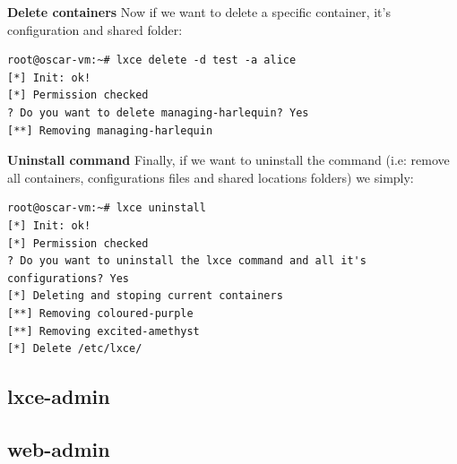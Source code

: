 \textbf{Delete containers}
Now if we want to delete a specific container, it's configuration and shared folder:

\begin{verbatim}
root@oscar-vm:~# lxce delete -d test -a alice
[*] Init: ok!
[*] Permission checked
? Do you want to delete managing-harlequin? Yes
[**] Removing managing-harlequin
\end{verbatim}

\textbf{Uninstall command}
Finally, if we want to uninstall the command (i.e: remove all containers, configurations files and shared locations folders) we simply:
\begin{verbatim}
root@oscar-vm:~# lxce uninstall
[*] Init: ok!
[*] Permission checked
? Do you want to uninstall the lxce command and all it's configurations? Yes
[*] Deleting and stoping current containers
[**] Removing coloured-purple
[**] Removing excited-amethyst
[*] Delete /etc/lxce/
\end{verbatim}

\subsection{lxce-admin}
\subsection{web-admin}



